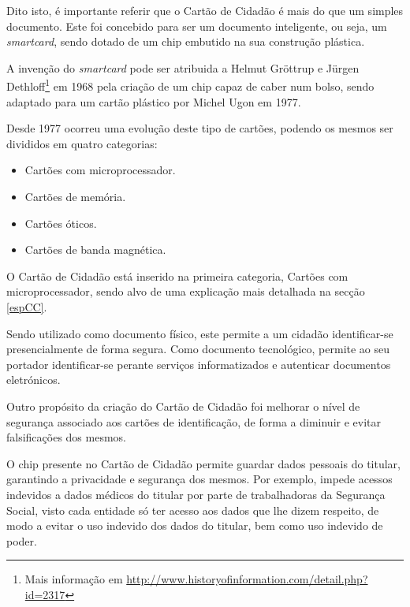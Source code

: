 Dito isto, é importante referir que o Cartão de Cidadão é mais do que um simples documento. Este foi concebido para ser um documento inteligente, ou seja, um \emph{smartcard}, sendo dotado de um chip embutido na sua construção plástica.

A invenção do \emph{smartcard} pode ser atribuida a Helmut Gröttrup e Jürgen Dethloff\footnote{Mais informação em \url{http://www.historyofinformation.com/detail.php?id=2317}} em 1968 pela criação de um chip capaz de caber num bolso, sendo adaptado para um cartão plástico por Michel Ugon em 1977.

Desde 1977 ocorreu uma evolução deste tipo de cartões, podendo os mesmos ser divididos em quatro categorias:

\begin{itemize}
    \item Cartões com microprocessador.
    \item Cartões de memória.
    \item Cartões óticos.
    \item Cartões de banda magnética.
\end{itemize}

O Cartão de Cidadão está inserido na primeira categoria, Cartões com microprocessador, sendo alvo de uma explicação mais detalhada na secção \ref{espCC}. 

Sendo utilizado como documento físico, este permite a um cidadão identificar-se presencialmente de forma segura. Como documento tecnológico, permite ao seu portador identificar-se perante serviços informatizados e autenticar documentos eletrónicos.

Outro propósito da criação do Cartão de Cidadão foi melhorar o nível de segurança associado aos cartões de identificação, de forma a diminuir e evitar falsificações dos mesmos.

O chip presente no Cartão de Cidadão permite guardar dados pessoais do titular, garantindo a privacidade e segurança dos mesmos. Por exemplo, impede acessos indevidos a dados médicos do titular por parte de trabalhadoras da Segurança Social, visto cada entidade só ter acesso aos dados que lhe dizem respeito, de modo a evitar o uso indevido dos dados do titular, bem como uso indevido de poder.

 

